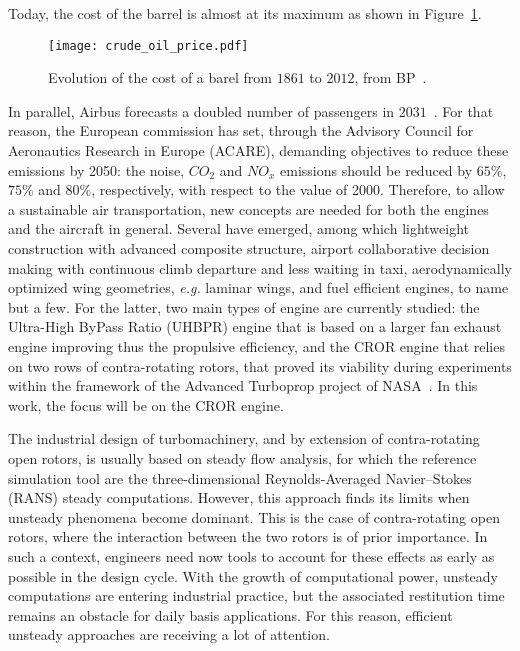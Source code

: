 Today, the cost of the barrel is almost at its maximum as shown
in Figure~\ref{fig:crude_oil_price}.
\begin{figure}[htp]
  \centering
  \texttt{[image: crude\_oil\_price.pdf]}
  \caption{Evolution of the cost of a barel from $1861$ to $2012$, from BP~\cite{bpreview2013}.}
  \label{fig:crude_oil_price}
\end{figure}
In parallel, Airbus forecasts a doubled number of passengers in
$2031$~\cite{AirbusForecast2013}. For that reason, the European commission has set, through the
Advisory Council for Aeronautics Research in Europe (ACARE),
demanding objectives to reduce these emissions by 2050:
the noise, $CO_2$ and $NO_x$ emissions should be reduced by 
$65\%$, $75\%$ and $80\%$, respectively, with respect to
the value of 2000.
Therefore, to allow a sustainable air transportation, new
concepts are needed for both the engines and the 
aircraft in general.
Several have emerged, among which lightweight construction
with advanced composite structure, airport collaborative decision
making with continuous climb departure and less waiting in taxi,
aerodynamically optimized wing geometries, \emph{e.g.} laminar wings,
and fuel efficient engines, to name but a few.
For the latter, two main types of engine are currently studied: the
Ultra-High ByPass Ratio (UHBPR) engine that is based on a
larger fan exhaust engine improving thus the
propulsive efficiency, and the CROR
engine that relies on two rows of contra-rotating rotors,
that proved its viability during experiments within the framework of
the Advanced Turboprop project of NASA~\cite{Hager1988}.
In this work, the focus will be on the CROR engine.
\newline 

The industrial design of turbomachinery, and by extension of contra-rotating
open rotors, is usually based on steady flow analysis, 
for which the reference simulation tool are the three-dimensio\-nal Reynolds-Averaged 
Navier--Stokes (RANS) steady computations. However, this approach finds its limits 
when unsteady phenomena become dominant. This is the case of 
contra-rotating open rotors, where the interaction between the
two rotors is of prior importance. 
In such a
context, engineers need now tools to account for these effects as
early as possible in the design cycle. With the growth of
computational power, unsteady computations are entering industrial
practice, but the associated restitution time remains an obstacle for
daily basis applications.  For this reason, efficient
unsteady approaches are receiving a lot of attention. 

